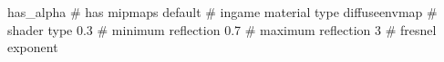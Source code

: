 has_alpha
# has mipmaps
default			 # ingame material type
diffuseenvmap            # shader type
0.3			 # minimum reflection
0.7			 # maximum reflection
3			 # fresnel exponent



